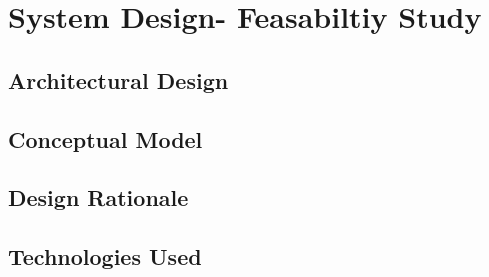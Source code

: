 \chapter{System Design- Feasabiltiy Study}

\section{Architectural Design}
\section{Conceptual Model}
\section{Design Rationale}
\section{Technologies Used}